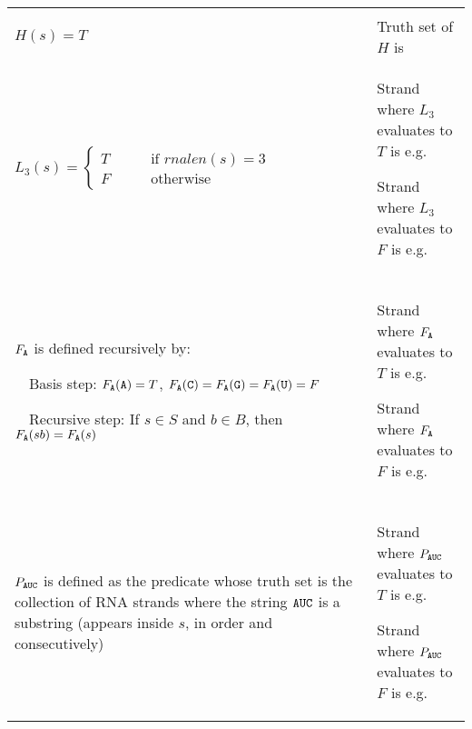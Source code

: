 \documentclass[12pt, oneside]{article}
\begin{document}
\begin{center}
\begin{tabular}{|p{4in}p{3.5in}|}
\hline
& \\
$H(s) = T$ & Truth set of $H$ is \underline{\phantom{$S$\hspace{1in}}}\\
\hline
$L_3(s) = \begin{cases}
T &\qquad\text{if $rnalen(s) = 3$} \\
F & \qquad\text{otherwise}
\end{cases}$ & 
Strand where $L_3$ evaluates to $T$ is e.g.\underline{\phantom{$\A\A\A$~\hspace{0.3in}}}

\vspace{10pt}

Strand where $L_3$ evaluates to $F$ is e.g. \underline{\phantom{$\A\A\U\A$\hspace{0.3in}}}\\
\hline
& \\
$F_{\texttt{A}}$ is defined recursively by: 

~~Basis step: $F_{\texttt{A}}(\texttt{A}) = T$, $F_{\texttt{A}}(\texttt{C}) = F_{\texttt{A}}(\texttt{G}) = F_{\texttt{A}}(\texttt{U}) = F$

~~Recursive step: If $s \in S$ and $b \in B$, then $F_{\texttt{A}}(sb) = F_{\texttt{A}}(s)$& 
Strand where $F_{\texttt{A}}$ evaluates to $T$ is e.g.\underline{\phantom{$\A\C\G$~\hspace{0.3in}}}

\vspace{10pt}

Strand where $F_{\texttt{A}}$ evaluates to $F$ is e.g. \underline{\phantom{$\U\A\C\U$\hspace{0.3in}}}\\
\hline
& \\
$P_{\texttt{A}\texttt{U}\texttt{C}}$ is defined as the predicate whose truth set
is the collection of RNA strands where the string $\texttt{A}\texttt{U}\texttt{C}$
is a substring (appears inside $s$, in order and consecutively)& 
Strand where $P_{\texttt{A}\texttt{U}\texttt{C}}$ evaluates to $T$ is e.g.\underline{\phantom{$\A\A\A$~\hspace{0.3in}}}

\vspace{10pt}

Strand where $P_{\texttt{A}\texttt{U}\texttt{C}}$ evaluates to $F$ is e.g. \underline{\phantom{$\A\A\U\A$\hspace{0.3in}}}\\
\hline
\end{tabular}
\end{center}
\end{document}
